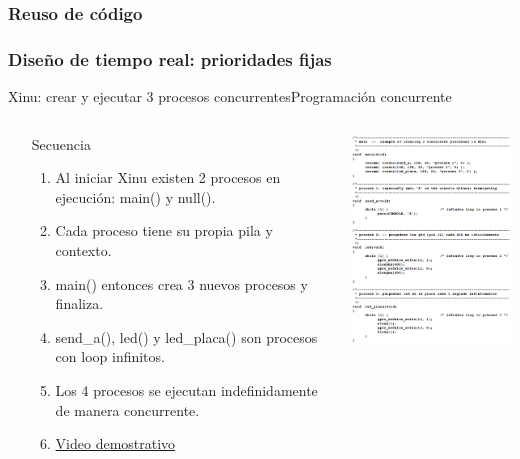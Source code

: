 \documentclass[8pt,aspectratio=169,compress]{beamer}
\begin{document}
\subsubsection{Reuso de código}
\subsubsection{Diseño de tiempo real: prioridades fijas}













\begin{frame}[fragile]{Xinu: crear y ejecutar 3 procesos concurrentes}{Programación concurrente}

    \begin{columns}[onlytextwidth,T]
      \column{\dimexpr\linewidth-70mm-5mm}

\begin{small}
	\begin{itemize}
\bigskip
  \item[Secuencia]
\begin{enumerate}
\item Al iniciar Xinu existen 2 procesos en ejecución: main() y null().
\bigskip
\item Cada proceso tiene su propia pila y contexto.
\bigskip
\item main() entonces crea 3 nuevos procesos y finaliza.
\bigskip
\item send\_a(), led() y led\_placa() son procesos \\ con loop infinitos.
\bigskip
\item Los 4 procesos se ejecutan indefinidamente \\ de manera concurrente.
\bigskip
\item \textcolor{blue}{\href{https://youtu.be/Xg1l9pvxluE/}{Video demostrativo}}
\end{enumerate}
	\end{itemize}

\end{small}

      \column{60mm}
     \includegraphics[width=58mm]{images/3tasks.png}

    \end{columns}
\end{frame}
\end{document}
